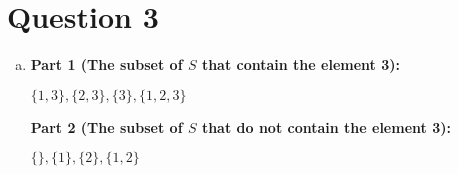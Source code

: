 \documentclass[12pt]{article}
\begin{document}
\section*{Question 3}
\begin{enumerate}[a.]
    \item

    \textbf{Part 1 (The subset of $S$ that contain the element 3):}

    $\{1,3\}, \{2,3\}, \{3\}, \{1,2,3\}$

    \bigskip

    \textbf{Part 2 (The subset of $S$ that do not contain the element 3):}

    $\{\},\{1\},\{2\},\{1,2\}$

\end{enumerate}
\end{document}
